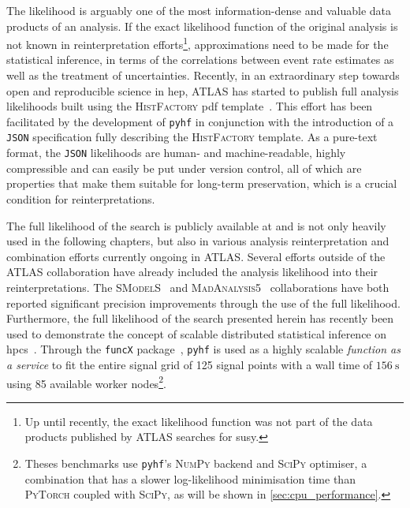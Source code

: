 The likelihood is arguably one of the most information-dense and valuable data products of an analysis. If the exact likelihood function of the original analysis is not known in reinterpretation efforts\footnote{Up until recently, the exact likelihood function was not part of the data products published by ATLAS searches for \gls{susy}.}, approximations need to be made for the statistical inference, \eg in terms of the correlations between event rate estimates as well as the treatment of uncertainties. Recently, in an extraordinary step towards open and reproducible science in \gls{hep}, ATLAS has started to publish full analysis likelihoods built using the \textsc{HistFactory} \gls{pdf} template~\cite{ATL-PHYS-PUB-2019-029}. This effort has been facilitated by the development of \texttt{pyhf} in conjunction with the introduction of a \texttt{JSON} specification fully describing the \textsc{HistFactory} template. As a pure-text format, the \texttt{JSON} likelihoods are human- and machine-readable, highly compressible and can easily be put under version control, all of which are properties that make them suitable for long-term preservation, which is a crucial condition for reinterpretations.

The full likelihood of the \onelepton search is publicly available at \cite{fullLH_1Lbb} and is not only heavily used in the following chapters, but also in various analysis reinterpretation and combination efforts currently ongoing in ATLAS. Several efforts outside of the ATLAS collaboration have already included the analysis likelihood into their reinterpretations.
The \textsc{SModelS}~\cite{SModelS_pyhf:2020grj} and \textsc{MadAnalysis5}~\cite{Goodsell:2020ddr,Fuks:2021wpe} collaborations have both reported significant precision improvements through the use of the full likelihood. Furthermore, the full likelihood of the search presented herein has recently been used to demonstrate the concept of scalable distributed statistical inference on \glspl{hpc}~\cite{Feickert:2021sua}.
Through the \texttt{funcX} package~\cite{chard20funcx}, \texttt{pyhf} is used as a highly scalable \textit{function as a service} to fit the entire \onelepton signal grid of 125 signal points with a wall time of $\SI{156}{\second}$ using 85 available worker nodes\footnote{Theses benchmarks use \texttt{pyhf}'s \textsc{NumPy} backend and \textsc{SciPy} optimiser, a combination that has a slower log-likelihood minimisation time than \eg \textsc{PyTorch} coupled with \textsc{SciPy}, as will be shown in \cref{sec:cpu_performance}.}.

